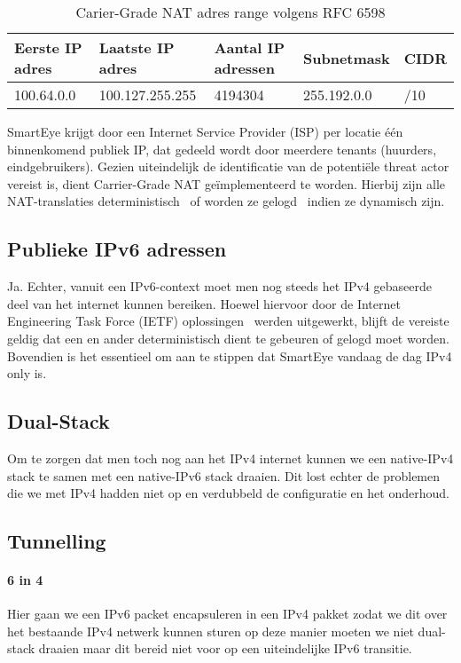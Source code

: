 \begin{table}[!htbp]
    \caption{Carier-Grade NAT adres range volgens RFC 6598}
    \label{tab:Carrier-GradeNATAdressRanges}
    \begin{tabular}{lllll}
        \hline
        \multicolumn{1}{|l|}{Eerste IP adres} & \multicolumn{1}{l|}{Laatste IP adres} & \multicolumn{1}{l|}{Aantal IP adressen} & \multicolumn{1}{l|}{Subnetmask} & \multicolumn{1}{l|}{CIDR} \\ \hline
        100.64.0.0                            & 100.127.255.255                     & 4194304                                       & 255.192.0.0                   & /10
    \end{tabular}
\end{table}

SmartEye krijgt door een Internet Service Provider (ISP) per locatie één binnenkomend publiek IP, dat gedeeld wordt door meerdere tenants (huurders, eindgebruikers). Gezien uiteindelijk de identificatie van de potentiële threat actor vereist is, dient Carrier-Grade NAT geïmplementeerd te worden. Hierbij zijn alle NAT-translaties deterministisch~\autocite{Donley2014} of worden ze gelogd~\autocite{Perreault2013} indien ze dynamisch zijn.

\subsection{Publieke IPv6 adressen}
Ja. Echter, vanuit een IPv6-context moet men nog steeds het IPv4 gebaseerde deel van het internet kunnen bereiken. Hoewel hiervoor door de Internet Engineering Task Force (IETF) oplossingen~\autocite{Arkko2011} werden uitgewerkt, blijft de vereiste geldig dat een en ander deterministisch dient te gebeuren of gelogd moet worden. Bovendien is het essentieel om aan te stippen dat SmartEye vandaag de dag IPv4 only is.

\subsection{Dual-Stack}
Om te zorgen dat men toch nog aan het IPv4 internet kunnen  we een native-IPv4 stack te samen met een native-IPv6 stack  draaien. Dit lost echter de problemen die we met IPv4 hadden niet op en verdubbeld de configuratie en het onderhoud.

\subsection{Tunnelling}
\paragraph{6 in 4}
Hier gaan we een IPv6 packet encapsuleren in een IPv4 pakket zodat we dit over het bestaande IPv4 netwerk kunnen sturen op deze manier moeten we niet dual-stack draaien maar dit bereid niet voor op een uiteindelijke IPv6 transitie.


